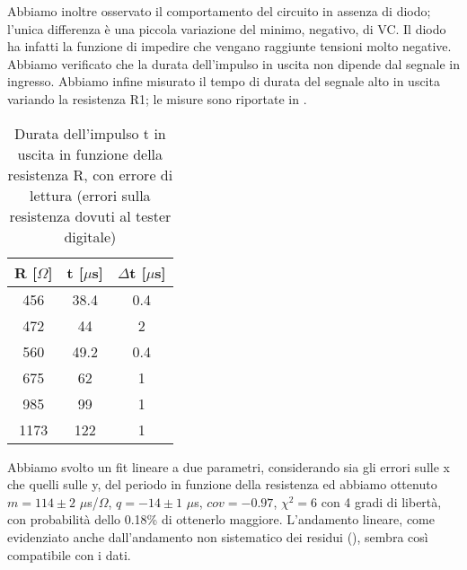 Abbiamo inoltre osservato il comportamento del circuito in assenza di diodo; l'unica differenza è una piccola variazione del minimo, negativo, di VC. Il diodo ha infatti la funzione di impedire che vengano raggiunte tensioni molto negative.\\
Abbiamo verificato che la durata dell'impulso in uscita non dipende dal segnale in ingresso.
Abbiamo infine misurato il tempo di durata del segnale alto in uscita variando la resistenza R1; le misure sono riportate in .
\begin{table}[h]
	\centering
	\begin{tabular}{ccc}
		{R [$\Omega$]} & {t [$\mu $s]} & {$\Delta$t [$\mu $s]} \\
		\midrule
           456 & 38.4 & 0.4\\
           472 & 44 & 2\\
           560 & 49.2 & 0.4\\
           675 & 62 & 1\\
           985 & 99 & 1\\
           1173 & 122 & 1\\
 	\end{tabular}
	\caption{ Durata dell'impulso t in uscita in funzione della resistenza R, con errore di lettura (errori sulla resistenza dovuti al tester digitale)}
	\label{t:Durata_impulso}
\end{table}
Abbiamo svolto un fit lineare a due parametri, considerando sia gli errori sulle x che quelli sulle y, del periodo in funzione della resistenza ed abbiamo ottenuto $m = 114 \pm 2$ $\mu$s/$\Omega$, $q = -14 \pm 1$ $\mu$s, $cov = -0.97$, $\chi^2 = 6$ con 4 gradi di libertà, con probabilità dello 0.18\% di ottenerlo maggiore. L'andamento lineare, come evidenziato anche dall'andamento non sistematico dei residui (), sembra così compatibile con i dati.